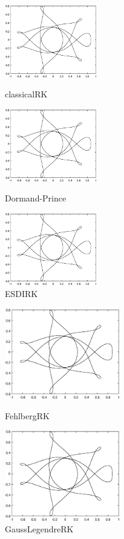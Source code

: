 \documentclass[12]{article}%
\begin{document}
\begin{figure}[H]
    \centering
    \begin{minipage}[t]{0.3\textwidth}
    \centering
    \includegraphics[width=4cm]{../pic/RK.eps}
    \caption{classicalRK}
    \end{minipage}
    \begin{minipage}[t]{0.3\textwidth}
    \centering
    \includegraphics[width=4cm]{../pic/DormandPrinceRK.eps}
    \caption{Dormand-Prince}
    \end{minipage}
    \begin{minipage}[t]{0.3\textwidth}
    \centering
    \includegraphics[width=4cm]{../pic/ESDIRK.eps}
    \caption{ESDIRK}
    \end{minipage}
\end{figure}
\begin{figure}[H]
    \centering
    \begin{minipage}[t]{0.48\textwidth}
    \centering
    \includegraphics[width=5cm]{../pic/FehlbergRK.eps}
    \caption{FehlbergRK}
    \end{minipage}
    \begin{minipage}[t]{0.48\textwidth}
    \centering
    \includegraphics[width=5cm]{../pic/GaussLegendreRK.eps}
    \caption{GaussLegendreRK}
    \end{minipage}
\end{figure}
\end{document}
